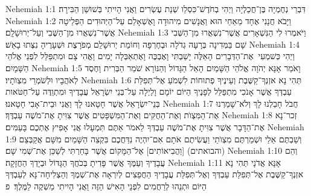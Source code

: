 Nehemiah 1:1	דִּבְרֵי נְחֶמְיָה בֶּן־חֲכַלְיָה וַיְהִי בְחֹדֶשׁ־כִּסְלֵו שְׁנַת עֶשְׂרִים וַאֲנִי הָיִיתִי בְּשׁוּשַׁן הַבִּירָה׃
Nehemiah 1:2	וַיָּבֹא חֲנָנִי אֶחָד מֵאַחַי הוּא וַאֲנָשִׁים מִיהוּדָה וָאֶשְׁאָלֵם עַל־הַיְּהוּדִים הַפְּלֵיטָה אֲשֶׁר־נִשְׁאֲרוּ מִן־הַשֶּׁבִי וְעַל־יְרוּשָׁלָ͏ִם׃
Nehemiah 1:3	וַיֹּאמְרוּ לִי הַנִּשְׁאָרִים אֲשֶׁר־נִשְׁאֲרוּ מִן־הַשְּׁבִי שָׁם בַּמְּדִינָה בְּרָעָה גְדֹלָה וּבְחֶרְפָּה וְחוֹמַת יְרוּשָׁלַ͏ִם מְפֹרָצֶת וּשְׁעָרֶיהָ נִצְּתוּ בָאֵשׁ׃
Nehemiah 1:4	וַיְהִי כְּשׁמְעִי  אֶת־הַדְּבָרִים הָאֵלֶּה יָשַׁבְתִּי וָאֶבְכֶּה וָאֶתְאַבְּלָה יָמִים וָאֱהִי צָם וּמִתְפַּלֵּל לִפְנֵי אֱלֹהֵי הַשָּׁמָיִם׃
Nehemiah 1:5	וָאֹמַר אָנָּא יְהֹוָה אֱלֹהֵי הַשָּׁמַיִם הָאֵל הַגָּדוֹל וְהַנּוֹרָא שֹׁמֵר הַבְּרִית וָחֶסֶד לְאֹהֲבָיו וּלְשֹׁמְרֵי מִצְוֺתָיו׃
Nehemiah 1:6	תְּהִי נָא אזְנְךָ־קַשֶּׁבֶת וְעֵינֶיךָ פְתוּחוֹת לִשְׁמֹעַ אֶל־תְּפִלַּת עַבְדְּךָ אֲשֶׁר אָנֹכִי מִתְפַּלֵּל לְפָנֶיךָ הַיּוֹם יוֹמָם וָלַיְלָה עַל־בְּנֵי יִשְׂרָאֵל עֲבָדֶיךָ וּמִתְוַדֶּה עַל־חַטֹּאות בְּנֵי־יִשְׂרָאֵל אֲשֶׁר חָטָאנוּ לָךְ וַאֲנִי וּבֵית־אָבִי חָטָאנוּ׃
Nehemiah 1:7	חֲבֹל חָבַלְנוּ לָךְ וְלֹא־שָׁמַרְנוּ אֶת־הַמִּצְוֺת וְאֶת־הַחֻקִּים וְאֶת־הַמִּשְׁפָּטִים אֲשֶׁר צִוִּיתָ אֶת־מֹשֶׁה עַבְדֶּךָ׃
Nehemiah 1:8	זְכר־נָא אֶת־הַדָּבָר אֲשֶׁר צִוִּיתָ אֶת־מֹשֶׁה עַבְדְּךָ לֵאמֹר אַתֶּם תִּמְעָלוּ אֲנִי אָפִיץ אֶתְכֶם בָּעַמִּים׃
Nehemiah 1:9	וְשַׁבְתֶּם אֵלַי וּשְׁמַרְתֶּם מִצְוֺתַי וַעֲשִׂיתֶם אֹתָם אִם־יִהְיֶה נִדַּחֲכֶם בִּקְצֵה הַשָּׁמַיִם מִשָּׁם אֲקַבְּצֵם (והבואתים) [וַהֲבִיאוֹתִים] אֶל־הַמָּקוֹם אֲשֶׁר בָּחַרְתִּי לְשַׁכֵּן אֶת־שְׁמִי שָׁם׃
Nehemiah 1:10	וְהֵם עֲבָדֶיךָ וְעַמֶּךָ אֲשֶׁר פָּדִיתָ בְּכֹחֲךָ הַגָּדוֹל וּבְיָדְךָ הַחֲזָקָה׃
Nehemiah 1:11	אָנָּא אֲדֹנָי תְּהִי נָא אזְנְךָ־קַשֶּׁבֶת אֶל־תְּפִלַּת עַבְדְּךָ וְאֶל־תְּפִלַּת עֲבָדֶיךָ הַחֲפֵצִים לְיִרְאָה אֶת־שְׁמֶךָ וְהַצְלִיחָה־נָּא לְעַבְדְּךָ הַיּוֹם וּתְנֵהוּ לְרַחֲמִים לִפְנֵי הָאִישׁ הַזֶּה וַאֲנִי הָיִיתִי מַשְׁקֶה לַמֶּלֶךְ׃ {פ}
